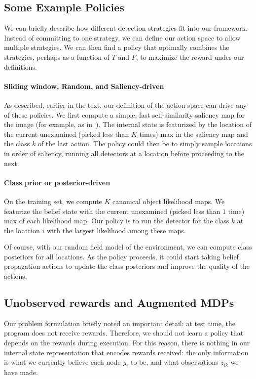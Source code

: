 \subsection{Some Example Policies} \label{sec:example_policies}
We can briefly describe how different detection strategies fit into our framework.
Instead of committing to one strategy, we can define our action space to allow multiple strategies.
We can then find a policy that optimally combines the strategies, perhaps as a function of $T$ and $F$, to maximize the reward under our definitions.

\paragraph{Sliding window, Random, and Saliency-driven}
As described, earlier in the text, our definition of the action space can drive any of these policies.
We first compute a simple, fast self-similarity saliency map for the image (for example, as in~\cite{Alexe2010}).
The internal state is featurized by the location of the current unexamined (picked less than $K$ times) max in the saliency map and the class $k$ of the last action.
The policy could then be to simply sample locations in order of saliency, running all detectors at a location before proceeding to the next.

\paragraph{Class prior or posterior-driven}
On the training set, we compute $K$ canonical object likelihood maps.
We featurize the belief state with the current unexamined (picked less than $1$ time) max of each likelihood map.
Our policy is to run the detector for the class $k$ at the location $i$ with the largest likelihood among these maps.

Of course, with our random field model of the environment, we can compute class posteriors for all locations.
As the policy proceeds, it could start taking belief propagation actions to update the class posteriors and improve the quality of the actions.

\subsection{Unobserved rewards and Augmented MDPs} \label{sec:misc}
Our problem formulation briefly noted an important detail: at test time, the program does not receive rewards.
Therefore, we should not learn a policy that depends on the rewards during execution.
For this reason, there is nothing in our internal state representation that encodes rewards received: the only information is what we currently believe each node $y_i$ to be, and what observations $z_{ik}$ we have made.

